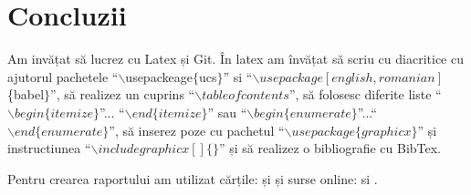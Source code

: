 \documentclass{report}
\begin{document}
\chapter{Concluzii}
\hspace*{0.3cm} Am invățat să lucrez cu Latex și Git. În latex am învățat să scriu cu diacritice cu ajutorul pachetele  ``$\backslash$usepackeage$\{$ucs$\}$'' si ``$\backslash usepackage[english,romanian]$\{babel$\}$'', să realizez un cuprins ``$\backslash tableofcontents$'', să folosesc diferite liste ``$\backslash begin\{itemize\}$''... ``$\backslash end\{itemize\}$'' sau ``$\backslash begin\{enumerate\}$''...``$\backslash end\{enumerate\}$'', să inserez poze cu pachetul ``$\backslash usepackage\{graphicx\}$'' și instructiunea ``$\backslash  includegraphicx[]\{\}$'' și să realizez o bibliografie cu BibTex.

Pentru crearea raportului am utilizat cărțile: \cite{book:2}  și \cite{book:1} și surse online:  \cite{3} si \cite{4}. 

 
\newpage
 

\end{document}
